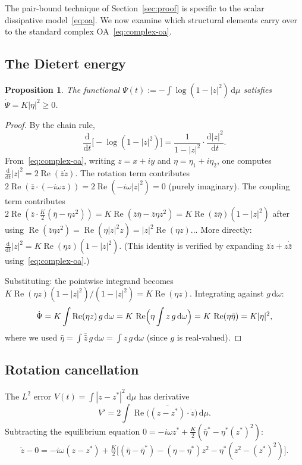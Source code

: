 \documentclass[11pt,a4paper]{article}
\newtheorem{proposition}[theorem]{Proposition}
\theoremstyle{definition}
\DeclareMathOperator{\re}{Re}
\begin{document}
The pair-bound technique of Section~\ref{sec:proof} is specific to the scalar dissipative model~\eqref{eq:oa}. We now examine which structural elements carry over to the standard complex OA~\eqref{eq:complex-oa}.

\subsection{The Dietert energy}

\begin{proposition}\label{prop:psi}
The functional $\Psi(t):=-\!\int\log(1-|z|^2)\,\mathrm{d}\mu$ satisfies $\dot\Psi = K|\eta|^2\geq 0$.
\end{proposition}
\begin{proof}
By the chain rule,
\[
\frac{\mathrm{d}}{\mathrm{d}t}\bigl[-\log(1-|z|^2)\bigr] = \frac{1}{1-|z|^2}\cdot\frac{\mathrm{d}|z|^2}{\mathrm{d}t}.
\]
From~\eqref{eq:complex-oa}, writing $z=x+iy$ and $\eta=\eta_1+i\eta_2$, one computes $\frac{\mathrm{d}}{\mathrm{d}t}|z|^2 = 2\re(\bar z\dot z)$. The rotation term contributes $2\re(\bar z\cdot(-i\omega z))=2\re(-i\omega|z|^2)=0$ (purely imaginary). The coupling term contributes $2\re(\bar z\cdot\tfrac{K}{2}(\bar\eta-\eta z^2))=K\re(\bar z\bar\eta-\bar z\eta z^2)=K\re(\bar z\bar\eta)(1-|z|^2)$ after using $\re(\bar z\eta z^2)=\re(\eta|z|^2z)=|z|^2\re(\eta z)$... More directly: $\frac{\mathrm{d}}{\mathrm{d}t}|z|^2 = K\re(\eta z)(1-|z|^2)$. (This identity is verified by expanding $\bar z\dot z+z\dot{\bar z}$ using~\eqref{eq:complex-oa}.)

Substituting: the pointwise integrand becomes $K\re(\eta z)(1-|z|^2)/(1-|z|^2)=K\re(\eta z)$. Integrating against $g\,\mathrm{d}\omega$:
\[
\dot\Psi = K\int\re(\eta z)\,g\,\mathrm{d}\omega = K\,\re\Bigl(\eta\int z\,g\,\mathrm{d}\omega\Bigr) = K\,\re(\eta\bar\eta) = K|\eta|^2,
\]
where we used $\bar\eta=\int\bar{\bar z}\,g\,\mathrm{d}\omega=\int z\,g\,\mathrm{d}\omega$ (since $g$ is real-valued).
\end{proof}

\subsection{Rotation cancellation}

The $L^2$ error $V(t)=\int|z-z^*|^2\,\mathrm{d}\mu$ has derivative
\[
V' = 2\int\re\bigl(\overline{(z-z^*)}\cdot\dot z\bigr)\,\mathrm{d}\mu.
\]
Subtracting the equilibrium equation $0=-i\omega z^*+\tfrac{K}{2}(\bar\eta^*-\eta^*(z^*)^2)$:
\[
\dot z - 0 = -i\omega(z-z^*) + \tfrac{K}{2}\bigl[(\bar\eta-\bar\eta^*)-(\eta-\eta^*) z^2-\eta^*(z^2-(z^*)^2)\bigr].
\]
\end{document}
